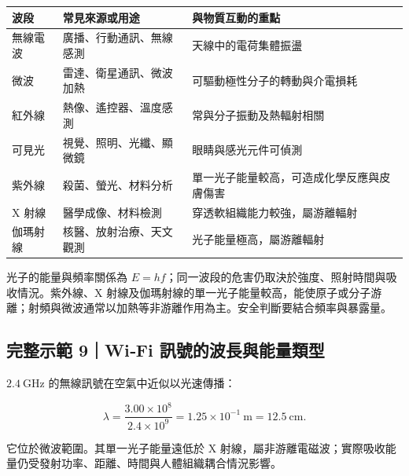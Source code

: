 \documentclass[11pt,a4paper]{article}
\newcounter{none}
\begin{document}
{\def\LTcaptype{none} %
\begin{longtable}[]{@{}
  >{\raggedright\arraybackslash}p{}
  >{\raggedright\arraybackslash}p{}
  >{\raggedright\arraybackslash}p{}@{}}
\toprule\noalign{}
\begin{minipage}[b]{\linewidth}\raggedright
波段
\end{minipage} & \begin{minipage}[b]{\linewidth}\raggedright
常見來源或用途
\end{minipage} & \begin{minipage}[b]{\linewidth}\raggedright
與物質互動的重點
\end{minipage} \\
\midrule\noalign{}
\endhead
\bottomrule\noalign{}
\endlastfoot
無線電波 & 廣播、行動通訊、無線感測 & 天線中的電荷集體振盪 \\
微波 & 雷達、衛星通訊、微波加熱 & 可驅動極性分子的轉動與介電損耗 \\
紅外線 & 熱像、遙控器、溫度感測 & 常與分子振動及熱輻射相關 \\
可見光 & 視覺、照明、光纖、顯微鏡 & 眼睛與感光元件可偵測 \\
紫外線 & 殺菌、螢光、材料分析 & 單一光子能量較高，可造成化學反應與皮膚傷害 \\
X 射線 & 醫學成像、材料檢測 & 穿透軟組織能力較強，屬游離輻射 \\
伽瑪射線 & 核醫、放射治療、天文觀測 & 光子能量極高，屬游離輻射 \\
\end{longtable}
}

光子的能量與頻率關係為 \(E=hf\)；同一波段的危害仍取決於強度、照射時間與吸收情況。紫外線、X 射線及伽瑪射線的單一光子能量較高，能使原子或分子游離；射頻與微波通常以加熱等非游離作用為主。安全判斷要結合頻率與暴露量。

\begin{HandoutWorkedExample}

\subsection{完整示範 9｜Wi‑Fi 訊號的波長與能量類型}\label{ux5b8cux6574ux793aux7bc4-9wifi-ux8a0aux865fux7684ux6ce2ux9577ux8207ux80fdux91cfux985eux578b}

\(2.4\ \mathrm{GHz}\) 的無線訊號在空氣中近似以光速傳播：

\[
\lambda=\frac{3.00\times10^8}{2.4\times10^9}
=1.25\times10^{-1}\ \mathrm m
=12.5\ \mathrm{cm}.
\]

它位於微波範圍。其單一光子能量遠低於 X 射線，屬非游離電磁波；實際吸收能量仍受發射功率、距離、時間與人體組織耦合情況影響。

\end{HandoutWorkedExample}
\end{document}
